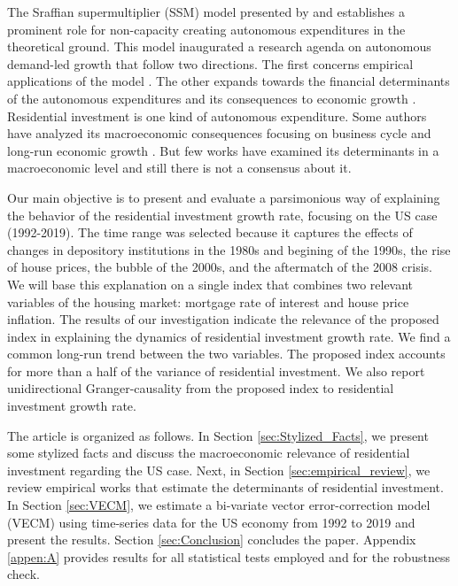 \documentclass[12pt, a4paper]{article}
\begin{document}
The Sraffian supermultiplier (SSM) model presented by \textcite{serrano_long_1995} and \textcite{bortis_institutions_1997} establishes a prominent role for non-capacity creating autonomous expenditures in the theoretical ground.
This model inaugurated a research agenda on autonomous demand-led growth that follow two directions.
The first concerns empirical applications of the model \cites{freitas_pattern_2013}{girardi_long-run_2016}{girardi_autonomous_2018}{Braga2020}{Haluska2020}.
The other expands towards the financial determinants of the autonomous expenditures and its consequences to economic growth \cites{Pariboni2016}{brochier_supermultiplier_2018}{Mandarino2020}{petrini_2021_TD}.
Residential investment is one kind of autonomous expenditure.
Some authors have analyzed its macroeconomic consequences focusing on business cycle and long-run economic growth  \cite{fiebiger_trend_2017,fiebiger_semi-autonomous_2018,perez_Montiel_2021,petrini_2021_TD}.
But few works have examined its determinants in a macroeconomic level and still there is not a consensus about it.

Our main objective is to present and evaluate a parsimonious way of explaining the behavior of the residential investment growth rate, focusing on the US case (1992-2019).
The time range was selected because it captures the effects of changes in depository institutions in the 1980s and  begining of the 1990s, the rise of house prices, the bubble of the 2000s, and the aftermatch of the 2008 crisis.
We will base this explanation on a single index that combines two relevant variables of the housing market: mortgage rate of interest and house price inflation.
The results of our investigation indicate the relevance of the proposed index in explaining the dynamics of residential investment growth rate.
We find a common long-run trend between the two variables.
The proposed index accounts for more than a half of the variance of residential investment.
We also report unidirectional Granger-causality from the proposed index to residential investment growth rate.

The article is organized as follows.
In Section \ref{sec:Stylized_Facts}, we present some stylized facts and discuss the macroeconomic relevance of residential investment regarding the US case.
Next, in Section \ref{sec:empirical_review}, we review empirical works that estimate the determinants of residential investment.
In Section \ref{sec:VECM}, we estimate a bi-variate vector error-correction model (VECM) using time-series data for the US economy from 1992 to 2019 and present the results.
Section \ref{sec:Conclusion} concludes the paper.
Appendix \ref{appen:A} provides results for all statistical tests employed and for the robustness check.
\end{document}
